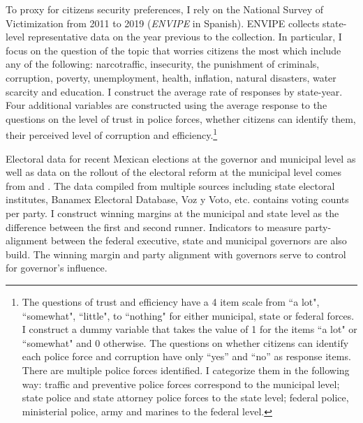 \documentclass[12pt]{amsart}
\numberwithin{equation}{section}
\theoremstyle{definition}
\theoremstyle{definition}
\theoremstyle{definition}
\begin{document}
To proxy for citizens security preferences, I rely on the National Survey of Victimization from 2011 to 2019 (\emph{ENVIPE} in Spanish). ENVIPE collects state-level representative data on the year previous to the collection.  In particular, I focus on the question of the topic that worries citizens the most which include any of the following: narcotraffic, insecurity, the punishment of criminals, corruption, poverty, unemployment, health, inflation, natural disasters, water scarcity and education. I construct the average rate of responses by state-year. Four additional variables are constructed using the average response to the questions on the level of trust in police forces, whether citizens can identify them, their perceived level of corruption and efficiency.\footnote{The questions of trust and efficiency have a 4 item scale from ``a lot", ``somewhat", ``little", to  ``nothing" for either municipal, state or federal forces. I construct a dummy variable that takes the value of 1 for the items ``a lot" or ``somewhat" and 0 otherwise. The questions on whether citizens can identify each police force and corruption have only ``yes'' and ``no'' as response items. There are multiple police forces identified. I categorize them in the following way: traffic and preventive police forces correspond to the municipal level; state police and state attorney police forces to the state level; federal police, ministerial police, army and marines to the federal level.} 
 
Electoral data for recent Mexican elections at the governor and municipal level as well as data on the rollout of the electoral reform at the municipal level comes from \citet{magar_2012} and \citet{magar_2017}. The data compiled from multiple sources including state electoral institutes, Banamex Electoral Database, Voz y Voto, etc. contains voting counts per party. I construct winning margins at the municipal and state level as the difference between the first and second runner. Indicators to measure party-alignment between the federal executive, state and municipal governors are also build. The winning margin and party alignment with governors serve to control for governor's influence. 
\end{document}
